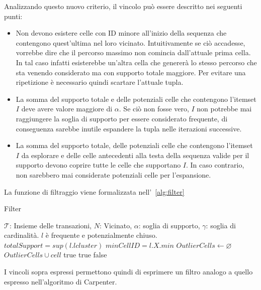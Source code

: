 Analizzando questo nuovo criterio, il vincolo può essere descritto nei seguenti punti: 
\begin{itemize}
    \item Non devono esistere celle con ID minore all'inizio della sequenza che contengono quest'ultima nel loro vicinato.
    Intuitivamente se ciò accadesse, vorrebbe dire che il percorso massimo non comincia dall'attuale prima cella.
    In tal caso infatti esisterebbe un'altra cella che genererà lo stesso percorso che sta venendo considerato ma con supporto totale maggiore.
    Per evitare una ripetizione è necessario quindi scartare l'attuale tupla.
    \item La somma del supporto totale e delle potenziali celle che contengono l'itemset \(I\) deve avere valore maggiore di \(\alpha\).
    Se ciò non fosse vero, \(I\) non potrebbe mai raggiungere la soglia di supporto per essere considerato frequente, di conseguenza 
    sarebbe inutile espandere la tupla nelle iterazioni successive.
    \item La somma del supporto totale, delle potenziali celle che contengono l'itemset \(I\) da esplorare e delle celle antecedenti alla testa della sequenza valide per il supporto devono coprire tutte le celle che supportano \(I\).
    In caso contrario, non sarebbero mai considerate potenziali celle per l'espansione.
    
\end{itemize}
La funzione di filtraggio viene formalizzata nell'~\cref{alg:filter}
\begin{algorithm}[H]
\caption{Filter}\label{alg:filter}
\begin{algorithmic}[1]
\Require $\mathcal{T}$: Insieme delle transazioni, $N$: Vicinato, $\alpha$: soglia di supporto, $\gamma$: soglia di cardinalità.
\Ensure $l$ è frequente e potenzialmente chiuso. 
 
\State $totalSupport = sup(l.lcluster)$ 
                                    
\State $minCellID = l.X.min$
\State $OutlierCells \gets \varnothing$
\State $OutlierCells \cup cell$
\EndIf
\EndFor
{} 
\State \Return true
\EndIf
\Else  {}
\State \Return true
\EndIf
\EndIf
\EndIf
\State \Return false
\end{algorithmic}
\end{algorithm}

I vincoli sopra espressi permettono quindi di esprimere un filtro analogo a quello espresso nell'algoritmo di Carpenter.